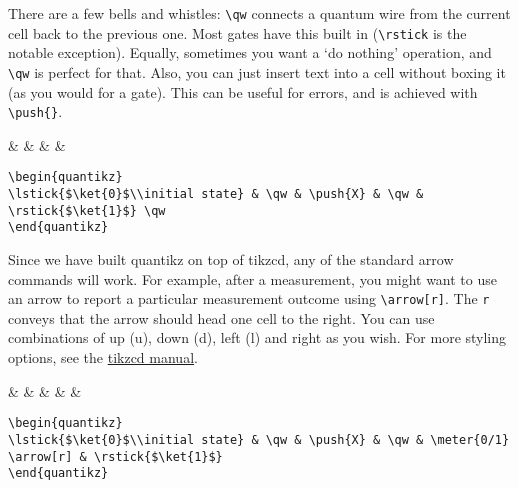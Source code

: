 \documentclass[aps,pra,10pt,nofootinbib]{revtex4}
\begin{document}
There are a few bells and whistles: \verb!\qw! connects a quantum wire from the current cell back to the previous one. Most gates have this built in (\verb!\rstick! is the notable exception). Equally, sometimes you want a `do nothing' operation, and \verb!\qw! is perfect for that. Also, you can just insert text into a cell without boxing it (as you would for a gate). This can be useful for errors, and is achieved with \verb!\push{}!. 
\begin{Code}
\begin{center}
\begin{quantikz}
 & \qw &  & \qw &  \qw
\end{quantikz}
\end{center}
\tcblower
\begin{lstlisting}
\begin{quantikz}
\lstick{$\ket{0}$\\initial state} & \qw & \push{X} & \qw & \rstick{$\ket{1}$} \qw
\end{quantikz}
\end{lstlisting}
\end{Code}
Since we have built quantikz on top of tikzcd, any of the standard arrow commands will work. For example, after a measurement, you might want to use an arrow to report a particular measurement outcome using \verb!\arrow[r]!. The \verb!r! conveys that the arrow should head one cell to the right. You can use combinations of up (u), down (d), left (l) and right as you wish. For more styling options, see the \href{http://mirrors.ctan.org/graphics/pgf/contrib/tikz-cd/tikz-cd-doc.pdf}{tikzcd manual}.
\begin{Code}
\begin{center}
\begin{quantikz}
 & \qw &  & \qw &  \arrow[r] & 
\end{quantikz}
\end{center}
\tcblower
\begin{lstlisting}
\begin{quantikz}
\lstick{$\ket{0}$\\initial state} & \qw & \push{X} & \qw & \meter{0/1} \arrow[r] & \rstick{$\ket{1}$}
\end{quantikz}
\end{lstlisting}
\end{Code}
\end{document}
